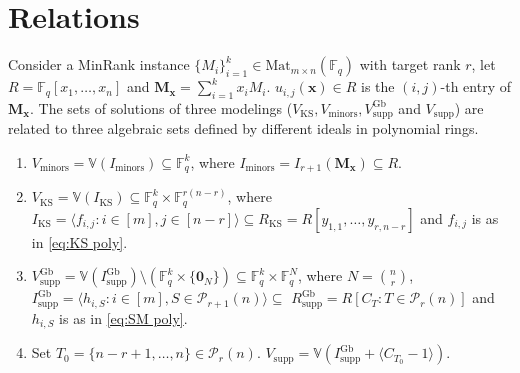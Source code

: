 \documentclass[a4paper, 11pt]{amsart}
\newcommand{\mc}[1]{\mathcal{#1}}
\newcommand{\mb}[1]{\mathbb{#1}}
\newcommand{\ideala}[1]{\langle{#1}\rangle}
\newcommand{\td}[1]{\bm{#1}}
\newcommand{\tx}[1]{\text{#1}}
\newcommand{\fq}{\mathbb{F}_q}
\theoremstyle{definition}
\theoremstyle{definition}
\begin{document}
	\section{Relations}\label{sec:relations}
	Consider a MinRank instance $\{M_i\}_{i=1}^k\in\tx{Mat}_{m\times n}(\fq)$ with target rank $r$, let $R=\fq[x_1,\dots,x_n]$ and $\td{M_x}=\sum^k_{i=1}x_iM_i$. $u_{i,j}(\td{x})\in R$ is the $(i,j)$-th entry of $\td{M_x}$. The sets of solutions of three modelings ($V_{\tx{KS}},V_{\tx{minors}},V_{\tx{supp}}^{\tx{Gb}}$ and $V_{\tx{supp}}$) are related to three algebraic sets defined by different ideals in polynomial rings. 
	
	\begin{enumerate}
		\item $V_{\tx{minors}}=\mb{V}(I_{\tx{minors}})\subseteq\fq^k$, where $I_{\tx{minors}}=I_{r+1}(\td{M_x})\subseteq R$.
		\item $V_{\tx{KS}}=\mb{V}(I_{\tx{KS}})\subseteq \fq^k\times\fq^{r(n-r)}$, where $I_{\tx{KS}}=\ideala{f_{i,j}:i\in [m],j\in [n-r]}\subseteq R_{\tx{KS}}=R[y_{1,1},\dots,y_{r,n-r}]$ and $f_{i,j}$ is as in \eqref{eq:KS poly}.
		\item $V^{\tx{Gb}}_{\tx{supp}}=\mb{V}(I^{\tx{Gb}}_{\tx{supp}})\setminus(\fq^k\times\{\td{0}_N\})\subseteq\fq^k\times\fq^N$, where $N=\binom{n}{r}$, $I^{\tx{Gb}}_{\tx{supp}}=\ideala{h_{i,S}:i\in[m],S\in\mc{P}_{r+1}(n)}\subseteq$ $ R^{\tx{Gb}}_{\tx{supp}}=R[C_T:T\in\mc{P}_r(n)]$ and $h_{i,S}$ is as in \eqref{eq:SM poly}.
		\item Set $T_0=\{n-r+1,\dots,n\}\in\mc{P}_r(n)$. $V_{\tx{supp}}=\mb{V}(I_{\tx{supp}}^{\tx{Gb}}+\ideala{C_{T_0}-1})$.
	\end{enumerate}
\end{document}
